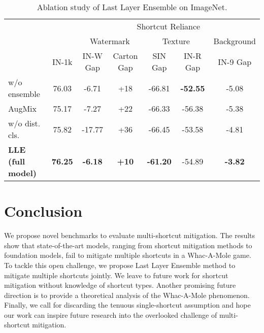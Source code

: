 \documentclass[10pt,twocolumn,letterpaper]{article}
\begin{document}
\begin{table}[t]
  \centering
  \begin{adjustbox}{width=\linewidth}
  \begin{tabular}{@{}lcccccc@{}}
  \toprule
                        & \multicolumn{1}{c|}{}      & \multicolumn{5}{c}{Shortcut Reliance}                                                                               \\ \cmidrule(l){3-7}
                     & \multicolumn{1}{c|}{}      & \multicolumn{2}{c|}{Watermark}                   & \multicolumn{2}{c|}{Texture}                    & Background     \\
                            & \multicolumn{1}{c|}{IN-1k} & IN-W Gap       & \multicolumn{1}{c|}{Carton Gap } & SIN Gap          & \multicolumn{1}{c|}{IN-R Gap } & IN-9 Gap       \\ \midrule
  w/o ensemble          & 76.03                      & -6.71          & +18                             & -66.81          & \textbf{-52.55}               & -5.08          \\
  AugMix            & 75.17                      & -7.27          & +22                             & -66.33          & -56.38               & -5.38          \\
  w/o dist. cls.        & 75.82                      & -17.77         & +36                             & -66.45          & -53.58                        & -4.81          \\
  \textbf{LLE (full model)}      & \textbf{76.25}             & \textbf{-6.18} & \textbf{+10}                    & \textbf{-61.20} & -54.89                        & \textbf{-3.82} \\ \bottomrule
  \end{tabular}
  \end{adjustbox}
  \caption{Ablation study of Last Layer Ensemble on ImageNet.}
  \label{tab:lle_ablation_imagenet}
  \vspace{-6mm}
\end{table}


\section{Conclusion}

We propose novel benchmarks to evaluate multi-shortcut mitigation.
The results show that state-of-the-art models, ranging from shortcut mitigation methods to foundation models, fail to mitigate multiple shortcuts in a Whac-A-Mole game.
To tackle this open challenge, we propose Last Layer Ensemble method to mitigate multiple shortcuts jointly.
We leave to future work for shortcut mitigation without knowledge of shortcut types. Another promising future direction is to provide a theoretical analysis of the Whac-A-Mole phenomenon.
Finally, we call for discarding the tenuous single-shortcut assumption and hope our work can inspire future research into the overlooked challenge of multi-shortcut mitigation.
\end{document}
